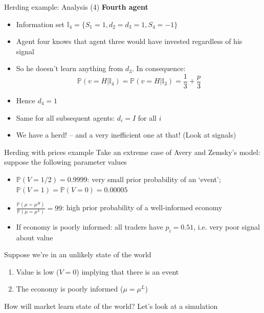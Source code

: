 \documentclass[english,10pt
,aspectratio=169
]{beamer}
\begin{document}
\begin{frame}{Herding example: Analysis (4)}
	\textbf{Fourth agent}
	\begin{itemize}
		\item Information set   $\mathbb{I}_4=\{S_1=1,d_2=d_3=1, S_4=-1\}$
		\item Agent four knows that agent three would have invested regardless of his signal
		\item So he doesn't learn anything from $d_3$. In consequence:
		\[
		\mathbb{P}(v=H|\mathbb{I}_4) =\mathbb{P}(v=H|\mathbb{I}_3) 	=\frac{1}{3} + \frac{p}{3}		
		\]
		\item Hence $d_4=1$
		\item Same for all subsequent agents: $d_i=I$ for all $i$
		\item We have a herd! -- and a very inefficient one at that! (Look at signals) \hyperlink{HERD}{}
	\end{itemize}
\end{frame}



\begin{frame}{Herding with prices example} \label{layers}
	Take an extreme case of Avery and Zemsky's model: suppose the following parameter values
	\begin{itemize}
		\item $\mathbb{P}(V=1/2)=0.9999$: very small prior probability of an `event'; $\mathbb{P}(V=1)=\mathbb{P}(V=0)=0.00005$
		\item $\frac{\mathbb{P}(\mu=\mu^{H})}{\mathbb{P}(\mu=\mu^{L})}=99$: high prior probability of a well-informed economy
		\item If economy is poorly informed: all traders have $p_{i}=0.51$, i.e. very poor signal about value
	\end{itemize}
	Suppose we're in an unlikely state of the world
	\begin{enumerate}
		\item Value is low ($V=0$) implying that there is an event
		\item The economy is poorly informed ($\mu=\mu^L$)
	\end{enumerate}
	How will  market learn state of the world? Let's look at a  simulation
\end{frame}
\end{document}
